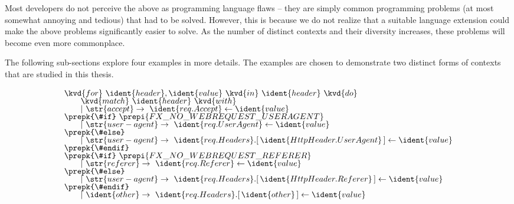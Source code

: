 Most developers do not perceive the above as programming language flaws -- they are simply common
programming problems (at most somewhat annoying and tedious) that had to be solved. However, this 
is because we do not realize that a suitable language extension could make the above problems 
significantly easier to solve. As the number of distinct contexts and their diversity increases,
these problems will become even more commonplace.

The following sub-sections explore four examples in more details. The examples are chosen to 
demonstrate two distinct forms of contexts that are studied in this thesis.


\begin{figure}
\begin{equation*}
\begin{array}{l}
\kvd{for}~\ident{header},\ident{value}~\kvd{in}~\ident{header}~\kvd{do}\\[-0.25em]
\hspace{2em}\kvd{match}~\ident{header}~\kvd{with}\\[-0.25em]
\hspace{2em}|~\str{accept} \rightarrow~ \ident{req.Accept} \leftarrow \ident{value}\\[-0.25em]
%
\prepk{\#if}~\prepi{FX\_NO\_WEBREQUEST\_USERAGENT}\\[-0.25em]
\hspace{2em}|~\str{user-agent} \rightarrow~ \ident{req.UserAgent} \leftarrow \ident{value}\\[-0.25em]
\prepk{\#else}\\[-0.25em]
\hspace{2em}|~\str{user-agent} \rightarrow~
  \ident{req.Headers}.[\,\ident{HttpHeader.UserAgent}\,] \leftarrow \ident{value}\\[-0.25em]
\prepk{\#endif}\\[-0.25em]
%
\prepk{\#if}~\prepi{FX\_NO\_WEBREQUEST\_REFERER}\\[-0.25em]
\hspace{2em}|~\str{referer} \rightarrow~ \ident{req.Referer} \leftarrow \ident{value}\\[-0.25em]
\prepk{\#else}\\[-0.25em]
\hspace{2em}|~\str{user-agent} \rightarrow~
  \ident{req.Headers}.[\,\ident{HttpHeader.Referer}\,] \leftarrow \ident{value}\\[-0.25em]
\prepk{\#endif}\\[-0.25em]
%
\hspace{2em}|~\ident{other} \rightarrow~ \ident{req.Headers}.[\,\ident{other}\,] \leftarrow \ident{value}\\[-0.25em]
\end{array}
\end{equation*}


\end{figure}

